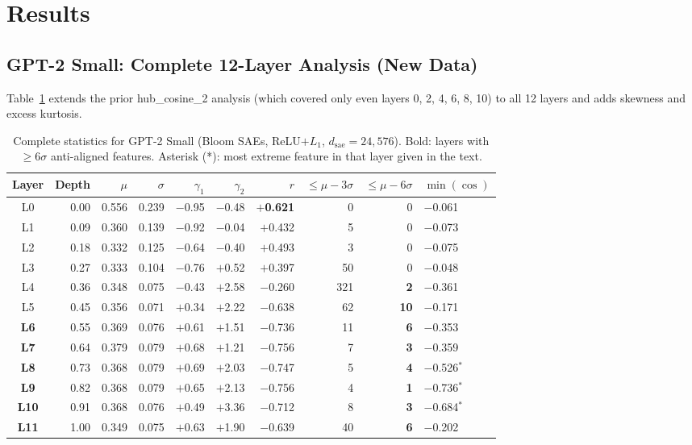 \documentclass[11pt,a4paper]{article}
\begin{document}
\section{Results}
\label{sec:results}

\subsection{GPT-2 Small: Complete 12-Layer Analysis (New Data)}
\label{sec:gpt2}

Table~\ref{tab:gpt2_full} extends the prior hub\_cosine\_2 analysis (which covered only even layers 0, 2, 4, 6, 8, 10) to all 12 layers and adds skewness and excess kurtosis.

\begin{table}[H]
\centering
\caption{Complete statistics for GPT-2 Small (Bloom SAEs, ReLU$+L_1$, $d_\text{sae}=24{,}576$). Bold: layers with $\geq 6\sigma$ anti-aligned features. Asterisk (*): most extreme feature in that layer given in the text.}
\label{tab:gpt2_full}
\small
\setlength{\tabcolsep}{4pt}
\begin{tabular}{@{}crrrrrrrrl@{}}
\toprule
Layer & Depth & $\mu$ & $\sigma$ & $\gamma_1$ & $\gamma_2$ & $r$ & ${\leq}\mu{-}3\sigma$ & ${\leq}\mu{-}6\sigma$ & $\min(\cos)$ \\
\midrule
L0  & 0.00 & 0.556 & 0.239 & $-$0.95 & $-$0.48 & \textbf{$+$0.621} &   0 &  0 & $-$0.061 \\
L1  & 0.09 & 0.360 & 0.139 & $-$0.92 & $-$0.04 & $+$0.432 &   5 &  0 & $-$0.073 \\
L2  & 0.18 & 0.332 & 0.125 & $-$0.64 & $-$0.40 & $+$0.493 &   3 &  0 & $-$0.075 \\
L3  & 0.27 & 0.333 & 0.104 & $-$0.76 & $+$0.52 & $+$0.397 &  50 &  0 & $-$0.048 \\
\midrule
L4  & 0.36 & 0.348 & 0.075 & $-$0.43 & $+$2.58 & $-$0.260 & 321 &  \textbf{2} & $-$0.361 \\
L5  & 0.45 & 0.356 & 0.071 & $+$0.34 & $+$2.22 & $-$0.638 &  62 & \textbf{10} & $-$0.171 \\
\textbf{L6}  & 0.55 & 0.369 & 0.076 & $+$0.61 & $+$1.51 & $-$0.736 &  11 &  \textbf{6} & $-$0.353 \\
\textbf{L7}  & 0.64 & 0.379 & 0.079 & $+$0.68 & $+$1.21 & $-$0.756 &   7 &  \textbf{3} & $-$0.359 \\
\textbf{L8}  & 0.73 & 0.368 & 0.079 & $+$0.69 & $+$2.03 & $-$0.747 &   5 &  \textbf{4} & $-$0.526$^*$ \\
\textbf{L9}  & 0.82 & 0.368 & 0.079 & $+$0.65 & $+$2.13 & $-$0.756 &   4 &  \textbf{1} & $-$0.736$^*$ \\
\textbf{L10} & 0.91 & 0.368 & 0.076 & $+$0.49 & $+$3.36 & $-$0.712 &   8 &  \textbf{3} & $-$0.684$^*$ \\
\textbf{L11} & 1.00 & 0.349 & 0.075 & $+$0.63 & $+$1.90 & $-$0.639 &  40 &  \textbf{6} & $-$0.202 \\
\bottomrule
\end{tabular}
\end{table}
\end{document}
